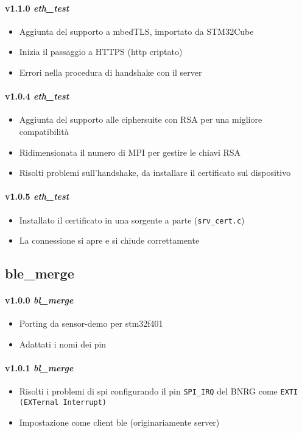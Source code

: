 \paragraph{v1.1.0 \textit{eth\_test}}
	\begin{itemize}
		\item Aggiunta del supporto a mbedTLS, importato da STM32Cube
		\item Inizia il passaggio a HTTPS (http criptato)
		\item Errori nella procedura di handshake con il server
	\end{itemize}
\paragraph{v1.0.4 \textit{eth\_test}}
	\begin{itemize}
		\item Aggiunta del supporto alle ciphersuite con RSA per una migliore compatibilit\`{a}
		\item Ridimensionata il numero di MPI per gestire le chiavi RSA
		\item Risolti problemi sull'handshake, da installare il certificato sul dispositivo
	\end{itemize}
\paragraph{v1.0.5 \textit{eth\_test}}
	\begin{itemize}
		\item Installato il certificato in una sorgente a parte (\texttt{srv\_cert.c})
		\item La connessione si apre e si chiude correttamente
	\end{itemize}

\subsection*{ble\_merge}

\paragraph{v1.0.0 \textit{bl\_merge}}
	\begin{itemize}
		\item Porting da sensor-demo per stm32f401
		\item Adattati i nomi dei pin
	\end{itemize}
\paragraph{v1.0.1 \textit{bl\_merge}}
	\begin{itemize}
    \item Risolti i problemi di spi configurando il pin \texttt{SPI\_IRQ} del BNRG come \texttt{EXTI (EXTernal Interrupt)}
		\item Impostazione come client ble (originariamente server)
	\end{itemize}
